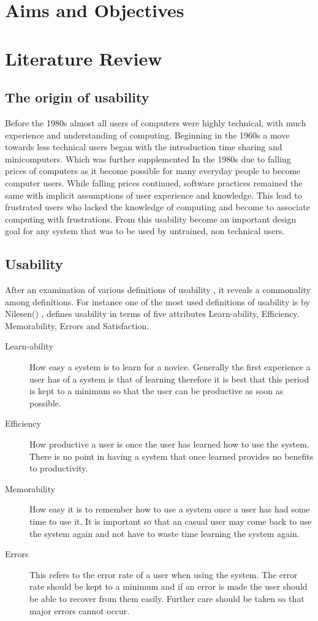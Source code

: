 \documentclass[a4paper,oneside,11pt]{report}
\begin{document}
\tableofcontents

\chapter{Aims and Objectives}
\chapter{Literature Review}
\section{The origin of usability}
Before the 1980s almost all users of computers were highly technical, with much experience and understanding of computing. Beginning in the 1960s a move towards less technical users began with the introduction time sharing and minicomputers. Which was further supplemented In the 1980s due to falling prices of computers as it become possible for many everyday people to become computer users. While falling prices continued, software practices remained the same with implicit assumptions of user experience and knowledge. This lead to frustrated users who lacked the knowledge of computing and become to associate computing with frustrations. From this usability become an important design goal for any system that was to be used by untrained, non technical users.\autocite{gilbert2013}

\section{Usability}
After an examination of various definitions of usability , it reveals a commonality among definitions. 
For instance one of the most used definitions of usability is by Nilesen(\citeyear{nielsens1993}) , defines usability in terms of five attributes Learn-ability, Efficiency. Memorability, Errors and Satisfaction.
\begin{description}
  \item[Learn-ability] How easy a system is to learn for a novice. Generally the first experience a user has of a system is that of learning therefore it is best that this period is kept to a minimum so that the user can be productive as soon as possible.
  \item[Efficiency] How productive a user is once the user has learned how to use the system. There is no point in having a system that once learned provides no benefits to productivity.
  \item[Memorability] How easy it is to remember how to use a system once a user has had some time to use it.  It is important so that an casual user may come back to use the system again and not have to waste time learning the system again.
  \item[Errors] This refers to the error rate of a user when using the system. The error rate should be kept to a minimum and if an error is made the user should be able to recover from them easily. Further care should be taken so that major errors cannot occur.
\end{description}
\end{document}
